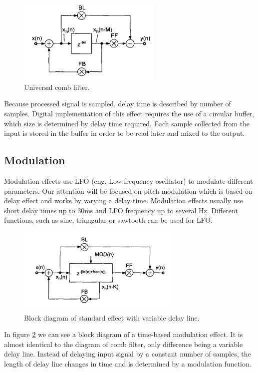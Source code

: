 \documentclass[a4paper,twoside,12pt]{book}
\begin{document}
\begin{figure}[H]
    \centering
    \includegraphics[width=0.618\textwidth]{images/comb}
    \caption{Universal comb filter\cite{Zolzer1}.}
    \label{fig:comb}
\end{figure}

Because processed signal is sampled,
delay time is described by number of samples.
Digital implementation of this effect requires the use of a circular buffer,
which size is determined by delay time required.
Each sample collected from the input is stored in the buffer
in order to be read later and mixed to the output.

\subsection{Modulation}
Modulation effects use LFO (eng. Low-frequency oscillator) to modulate different parameters.
Our attention will be focused on pitch modulation
which is based on delay effect and works by varying a delay time.
Modulation effects usually use short delay times up to 30ms
and LFO frequency up to several Hz.
Different functions, such as sine,
triangular or sawtooth can be used for LFO.

\begin{figure}[H]
    \centering
    \includegraphics[width=0.7\textwidth]{images/modulation}
    \caption{Block diagram of standard effect with variable delay line\cite{Zolzer1}.}
    \label{fig:Mod}
\end{figure}

In figure \ref{fig:Mod} we can see a block diagram of a
time-based modulation effect.
It is almost identical to the diagram of comb filter,
only difference being a variable delay line.
Instead of delaying input signal by a constant number of samples,
the length of delay line changes in time
and is determined by a modulation function.
\end{document}
